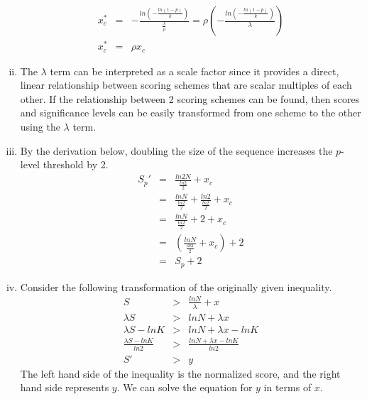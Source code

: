 \documentclass[a4paper, 10pt]{article}
\begin{document}
\begin{enumerate}[(i)]
\begin{eqnarray}
          x_c^{*} &=& -\frac{ln\left(-\frac{ln(1 - p)}{k}\right)}{\frac{\lambda}{\rho}} = \rho\left(-\frac{ln\left(-\frac{ln(1 - p)}{k}\right)}{\lambda}\right)     \nonumber \\
          x_c^{*} &=& \rho x_c                                                              \nonumber
        \end{eqnarray}
  \item The $\lambda$ term can be interpreted as a scale factor since it provides a direct, linear relationship between scoring schemes that are scalar multiples of each other. If the relationship between 2 scoring schemes can be found, then scores and significance levels can be easily transformed from one scheme to the other using the $\lambda$ term.
  \item By the derivation below, doubling the size of the sequence increases the $p$-level threshold by 2.
        \begin{eqnarray}
          S_p' &=& \frac{ln 2N}{\frac{ln 2}{2}} + x_c                              \nonumber \\
               &=& \frac{ln N}{\frac{ln 2}{2}} + \frac{ln 2}{\frac{ln 2}{2}} + x_c \nonumber \\
               &=& \frac{ln N}{\frac{ln 2}{2}} + 2 + x_c                           \nonumber \\
               &=& \left(\frac{ln N}{\frac{ln 2}{2}} + x_c \right) + 2             \nonumber \\
               &=& S_p + 2                                                         \nonumber
        \end{eqnarray}
  \item Consider the following transformation of the originally given inequality.
        \begin{eqnarray}
          S &>& \frac{ln N}{\lambda} + x                                         \nonumber \\
          \lambda S &>& ln N + \lambda x                                         \nonumber \\
          \lambda S - ln K &>& ln N + \lambda x - ln K                           \nonumber \\
          \frac{\lambda S - ln K}{ln 2} &>& \frac{ln N + \lambda x - ln K}{ln 2} \nonumber \\
          S' &>& y                                                               \nonumber
        \end{eqnarray}
        The left hand side of the inequality is the normalized score, and the right hand side represents $y$. We can solve the equation for $y$ in terms of $x$.

\end{enumerate}
\end{document}
